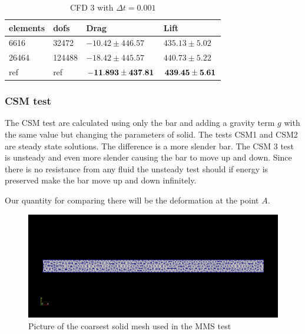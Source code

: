 \begin{table}[]
\centering
\caption{CFD 3 with $\Delta t = 0.001$}
\label{my-label}
\begin{tabular}{|l|l|l|l|}
\hline
\textbf{elements} & \textbf{dofs} & \textbf{Drag} & \textbf{Lift} \\ \hline
6616 & 32472 & $ -10.42 \pm 446.57  $ & $ 435.13 \pm 5.02 $ \\ \hline
26464 & 124488 & $ -18.42 \pm 445.57 $ & $ 440.73 \pm 5.22 $ \\ \hline
ref & ref & $\bold{ -11.893 \pm 437.81 }$ & $\bold{ 439.45 \pm 5.61 }$ \\ \hline
\end{tabular}
\end{table}

\subsubsection{CSM test}
The CSM test are calculated using only the bar and adding a gravity term $g$ with the same value but changing the parameters of solid. The tests CSM1 and CSM2 are steady state solutions. The difference is a more slender bar. The CSM 3 test is unsteady and even more slender causing the bar to move up and down. Since there is no resistance from any fluid the unsteady test should if energy is preserved make the bar move up and down infinitely. 

Our quantity for comparing there will be the deformation at the point $A$. 
\begin{center}
\begin{figure}[H]
\caption{Picture of the coarsest solid mesh used in the MMS test}
\includegraphics[scale=0.50,trim={18mm 55mm 18mm 55mm},clip]{./Verification_Validation/Hron_Turek/structure.png}
\end{figure}
\end{center}

\vspace{0cm}

